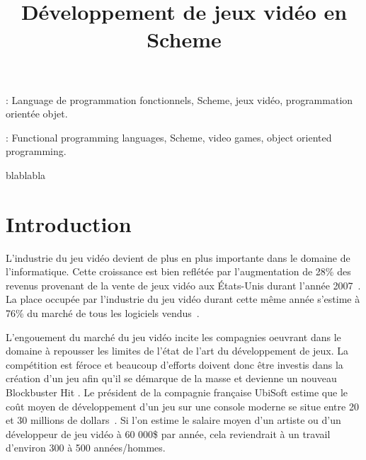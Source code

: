 \documentclass[12pt,oneside,letterpaper,francais]{book}
\title{Développement de jeux vidéo en Scheme}
\begin{document}
\setcounter{page}{1}
 \PagesCouverture

\resume


\vspace{2em}

: Language de programmation fonctionnels,
Scheme, jeux vidéo, programmation orientée objet.

\abstract



\vspace{2em}

: Functional programming languages, Scheme,
video games, object oriented programming.



 
\tabledesmatieres


\listedesfigures


\remerciements

blablabla

% 

\debutchapitres

\chapter{Introduction}
\label{Chap:Intro}

L'industrie du jeu vidéo devient de plus en plus importante dans le
domaine de l'informatique. Cette croissance est bien reflétée par
l'augmentation de 28\% des revenus provenant de la vente de jeux vidéo
aux États-Unis durant l'année 2007~\cite{NPD_Games_2007}. La place
occupée par l'industrie du jeu vidéo durant cette même année s'estime
à 76\% du marché de tous les logiciels vendus~\cite{NPD_Soft_2008}. 

L'engouement du marché du jeu vidéo incite les compagnies oeuvrant
dans le domaine à repousser les limites de l'état de l'art du
développement de jeux. La compétition est féroce et beaucoup
d'efforts doivent donc être investis dans la création d'un jeu afin qu'il
se démarque de la masse et devienne un nouveau \og Blockbuster Hit
\fg. Le président de la compagnie française UbiSoft estime que le coût
moyen de développement d'un jeu sur une console moderne se situe entre
20 et 30 millions de dollars~\cite{cbc_ubisoft}. Si l'on estime le
salaire moyen d'un artiste ou d'un développeur de jeu vidéo à 60
000\$ par année, cela reviendrait à un travail d'environ 300 à 500
années/hommes.
\end{document}
